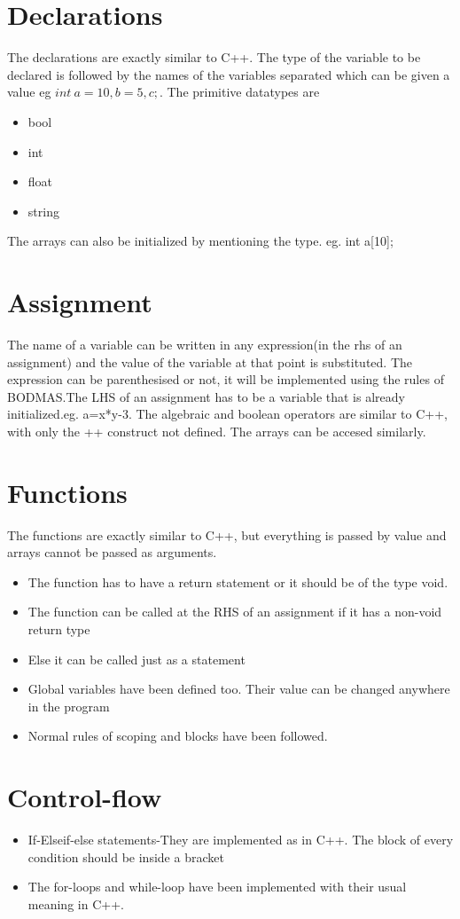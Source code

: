 \documentclass[12pt]{article}
\begin{document}
\section{Declarations}
The declarations are exactly similar to C++. The type of the variable to be declared is followed by the names of the variables separated which can be given a value eg $int\ a=10,b=5,c;$. 
 The primitive datatypes are
\begin{itemize}
\item bool
\item int
\item float
\item string
\end{itemize}
The arrays can also be initialized by mentioning the type.
eg. int a[10];
\section{Assignment}
The name of a variable can be written in any expression(in the rhs of an assignment) and the value of the variable at that point is substituted.
The expression can be parenthesised or not, it will be implemented using the rules of BODMAS.The LHS of an assignment has to be a variable that is already initialized.eg. a=x*y-3.
The algebraic and boolean operators are similar to C++, with only the ++ construct not defined. The arrays can be accesed similarly.
\section{Functions}
The functions are exactly similar to C++, but everything is passed by value and arrays cannot be passed as arguments.
\begin{itemize}
\item The function has to have a return statement or it should be of the type void.
\item The function can be called at the RHS of an assignment if it has a non-void return type
\item Else it can be called just as a statement
\item Global variables have been defined too. Their value can be changed anywhere in the program
\item Normal rules of scoping and blocks have been followed.
\end{itemize}
\section{Control-flow}
\begin{itemize}
\item If-Elseif-else statements-They are implemented as in C++. The block of every condition should be inside a {} bracket
\item The for-loops and while-loop have been implemented with their usual meaning in C++.
\end{itemize}
\end{document}
